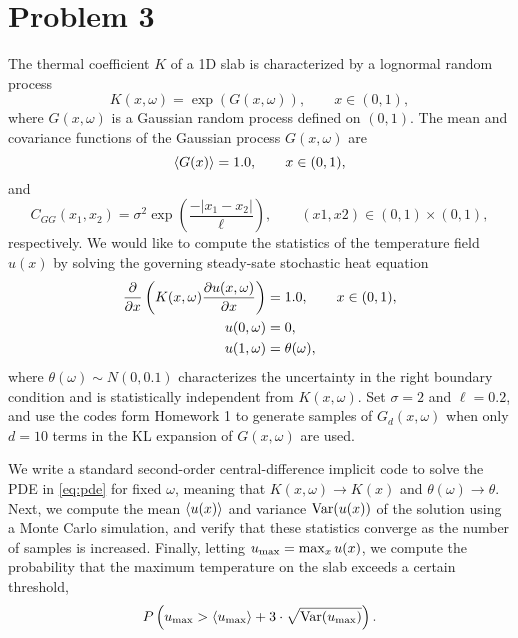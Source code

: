\documentclass[11pt]{article}
\begin{document}
\section*{Problem 3} %

The thermal coefficient $K$ of a 1D slab is characterized by a lognormal random process
\begin{equation*}
K(x,\omega) = \exp(G(x,\omega)), \qquad x \in (0,1),
\end{equation*}
where $G(x, \omega)$ is a Gaussian random process defined on $(0, 1)$. The mean and covariance functions of the Gaussian process $G(x, \omega)$ are
\begin{equation*}
\left\langle G(x) \right\rangle = 1.0, \qquad x \in (0,1),
\end{equation*}
and
\begin{equation*}
C_{GG}(x_1,x_2) = \sigma^2 \exp \left( \frac{- | x_1-x_2 | }{\ell} \right), \qquad (x1,x2) \in (0,1) \times (0,1),
\end{equation*}
respectively. We would like to compute the statistics of the temperature field $u(x)$ by solving the governing steady-sate stochastic heat equation
\begin{align}
\frac{\partial}{\partial x} \left( K(x,\omega) \frac{\partial u(x,\omega)}{\partial x} \right) &= 1.0, \qquad x \in (0,1), \\
u(0,\omega) &= 0, \\
u(1,\omega) &= \theta(\omega),
\label{eq:pde}
\end{align}
where $\theta(\omega) \sim N(0,0.1)$ characterizes the uncertainty in the right boundary condition and is statistically independent from $K(x,\omega)$. Set $\sigma=2$ and $\ell=0.2$, and use the codes form Homework 1 to generate samples of $G_d(x,\omega)$ when only $d=10$ terms in the KL expansion of $G(x,\omega)$ are used.

We write a standard second-order central-difference implicit code to solve the PDE in \eqref{eq:pde} for fixed $\omega$, meaning that $K(x,\omega) \rightarrow K(x)$ and $\theta(\omega) \rightarrow \theta$. Next, we compute the mean $\left\langle u(x) \right\rangle$ and variance $\operatorname{Var}(u(x))$ of the solution using a Monte Carlo simulation, and verify that these statistics converge as the number of samples is increased. Finally, letting $u_{\text{max}} = \max_x u(x)$, we compute the probability that the maximum temperature on the slab exceeds a certain threshold,
\begin{equation}
P \left( u_{\text{max}} > \left\langle u_{\text{max}} \right\rangle + 3 \cdot \sqrt{\operatorname{Var}(u_{\text{max}})} \right)
.
\label{eq:probability}
\end{equation}
\end{document}
